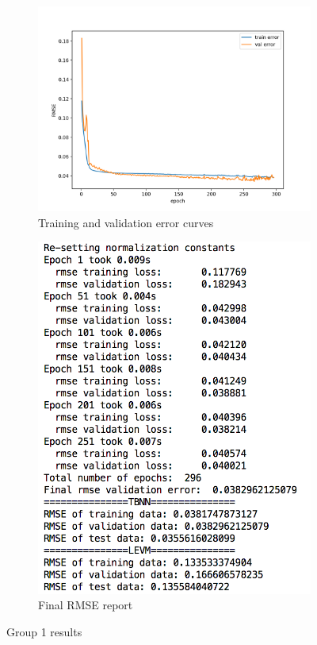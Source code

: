 \documentclass{article}
\numberwithin{equation}{section}
\begin{document}
\begin{figure}[h]
    \centering
    \begin{subfigure}{0.6\textwidth}
        \includegraphics[width=1.0\linewidth]{results/512samples/convergence.png}
        \caption{Training and validation error curves}
        \label{fig:convergence_group1}
    \end{subfigure}
    \begin{subfigure}{0.33\textwidth}
        \includegraphics[width=1.0\linewidth]{results/512samples/output.png}
        \caption{Final RMSE report}
        \label{fig:output_group1}
    \end{subfigure}
    \caption{Group 1 results}
    \label{fig:results_group1}
\end{figure}
\end{document}
